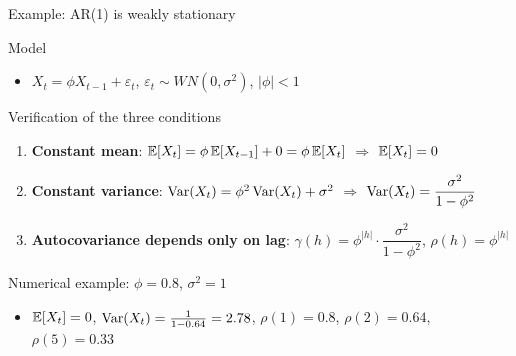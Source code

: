 \documentclass[9pt, aspectratio=169, t]{beamer}
\begin{document}
\begin{frame}{Example: AR(1) is weakly stationary}
    \vspace{-0.2cm}
    {\footnotesize
    \begin{exampleblock}{Model}
        \begin{itemize}\setlength{\itemsep}{0pt}
            \item $X_t = \phi X_{t-1} + \varepsilon_t$, \quad $\varepsilon_t \sim WN(0, \sigma^2)$, \quad $|\phi| < 1$
        \end{itemize}
    \end{exampleblock}
    \vspace{-2mm}
    \begin{block}{Verification of the three conditions}
        \begin{enumerate}\setlength{\itemsep}{1pt}
            \item \textbf{Constant mean}: $\mathbb{E}[X_t] = \phi\,\mathbb{E}[X_{t-1}] + 0 = \phi\,\mathbb{E}[X_t]$ \;\; $\Rightarrow$ \;\; $\mathbb{E}[X_t] = 0$
            \item \textbf{Constant variance}: $\text{Var}(X_t) = \phi^2\,\text{Var}(X_t) + \sigma^2$ \;\; $\Rightarrow$ \;\; $\text{Var}(X_t) = \dfrac{\sigma^2}{1 - \phi^2}$
            \item \textbf{Autocovariance depends only on lag}:
                $\gamma(h) = \phi^{|h|} \cdot \dfrac{\sigma^2}{1 - \phi^2}$, \quad
                $\rho(h) = \phi^{|h|}$
        \end{enumerate}
    \end{block}
    \vspace{-2mm}
    \begin{exampleblock}{Numerical example: $\phi = 0.8$, $\sigma^2 = 1$}
        \begin{itemize}\setlength{\itemsep}{0pt}
            \item $\mathbb{E}[X_t] = 0$, \quad $\text{Var}(X_t) = \frac{1}{1-0.64} = 2.78$, \quad $\rho(1) = 0.8$, \; $\rho(2) = 0.64$, \; $\rho(5) = 0.33$
        \end{itemize}
    \end{exampleblock}
    }
\end{frame}
\end{document}
